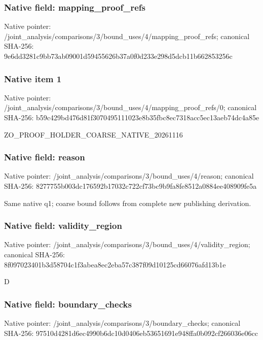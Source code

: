 \documentclass[10pt,a4paper]{article}
\begin{document}
\subsubsection{Native field: mapping\_\allowbreak{}proof\_\allowbreak{}refs}
Native pointer: /joint\_\allowbreak{}analysis/comparisons/3/bound\_\allowbreak{}uses/4/mapping\_\allowbreak{}proof\_\allowbreak{}refs; canonical SHA-256: 9e6dd3281c9bb73ab09001d59455626b37a0f0d233e298d5dcb11b662853256c

\subsubsection{Native item 1}
Native pointer: /joint\_\allowbreak{}analysis/comparisons/3/bound\_\allowbreak{}uses/4/mapping\_\allowbreak{}proof\_\allowbreak{}refs/0; canonical SHA-256: b59c429bd476d81f3070495111023e8b35fbc8ec7318acc5ec13aeb74dc4a85e

\begingroup\raggedright\sloppy ZO\_\allowbreak{}PROOF\_\allowbreak{}HOLDER\_\allowbreak{}COARSE\_\allowbreak{}NATIVE\_\allowbreak{}20261116\par\endgroup

\subsubsection{Native field: reason}
Native pointer: /joint\_\allowbreak{}analysis/comparisons/3/bound\_\allowbreak{}uses/4/reason; canonical SHA-256: 8277755b003dc176592b17032c722cf73bc9b9fa8fe8512a0884ee408909fe5a

\begingroup\raggedright\sloppy Same native q1;\allowbreak{} coarse bound follows from complete new publishing derivation.\par\endgroup

\subsubsection{Native field: validity\_\allowbreak{}region}
Native pointer: /joint\_\allowbreak{}analysis/comparisons/3/bound\_\allowbreak{}uses/4/validity\_\allowbreak{}region; canonical SHA-256: 8f097023401b3d58704c1f3abea8ec2eba57c387f09d10125cd66076afd13b1e

\begingroup\raggedright\sloppy D\par\endgroup

\subsubsection{Native field: boundary\_\allowbreak{}checks}
Native pointer: /joint\_\allowbreak{}analysis/comparisons/3/boundary\_\allowbreak{}checks; canonical SHA-256: 97510d4281d6ec4990b6dc10d0406eb53651691e948ffa0b092cf266036e06cc
\end{document}
